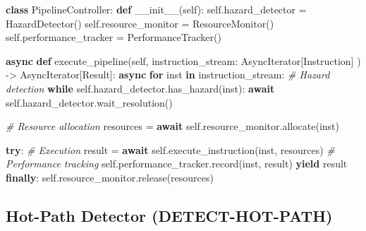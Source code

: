 \documentclass[
  11pt,
]{article}
\newenvironment{Shaded}{}{}
\newcommand{\CommentTok}[1]{\textcolor[rgb]{0.38,0.63,0.69}{\textit{#1}}}
\newcommand{\ControlFlowTok}[1]{\textcolor[rgb]{0.00,0.44,0.13}{\textbf{#1}}}
\newcommand{\FunctionTok}[1]{\textcolor[rgb]{0.02,0.16,0.49}{#1}}
\newcommand{\KeywordTok}[1]{\textcolor[rgb]{0.00,0.44,0.13}{\textbf{#1}}}
\newcommand{\NormalTok}[1]{#1}
\newcommand{\OperatorTok}[1]{\textcolor[rgb]{0.40,0.40,0.40}{#1}}
\newcommand{\VariableTok}[1]{\textcolor[rgb]{0.10,0.09,0.49}{#1}}
\begin{document}
\begin{Shaded}
\begin{Highlighting}[]
\KeywordTok{class}\NormalTok{ PipelineController:}
    \KeywordTok{def} \FunctionTok{\_\_init\_\_}\NormalTok{(}\VariableTok{self}\NormalTok{):}
        \VariableTok{self}\NormalTok{.hazard\_detector }\OperatorTok{=}\NormalTok{ HazardDetector()}
        \VariableTok{self}\NormalTok{.resource\_monitor }\OperatorTok{=}\NormalTok{ ResourceMonitor()}
        \VariableTok{self}\NormalTok{.performance\_tracker }\OperatorTok{=}\NormalTok{ PerformanceTracker()}
        
    \ControlFlowTok{async} \KeywordTok{def}\NormalTok{ execute\_pipeline(}\VariableTok{self}\NormalTok{, }
\NormalTok{                             instruction\_stream: AsyncIterator[Instruction]}
\NormalTok{                            ) }\OperatorTok{{-}\textgreater{}}\NormalTok{ AsyncIterator[Result]:}
        \ControlFlowTok{async} \ControlFlowTok{for}\NormalTok{ inst }\KeywordTok{in}\NormalTok{ instruction\_stream:}
            \CommentTok{\# Hazard detection}
            \ControlFlowTok{while} \VariableTok{self}\NormalTok{.hazard\_detector.has\_hazard(inst):}
                \ControlFlowTok{await} \VariableTok{self}\NormalTok{.hazard\_detector.wait\_resolution()}
                
            \CommentTok{\# Resource allocation}
\NormalTok{            resources }\OperatorTok{=} \ControlFlowTok{await} \VariableTok{self}\NormalTok{.resource\_monitor.allocate(inst)}
            
            \ControlFlowTok{try}\NormalTok{:}
                \CommentTok{\# Execution}
\NormalTok{                result }\OperatorTok{=} \ControlFlowTok{await} \VariableTok{self}\NormalTok{.execute\_instruction(inst, resources)}
                \CommentTok{\# Performance tracking}
                \VariableTok{self}\NormalTok{.performance\_tracker.record(inst, result)}
                \ControlFlowTok{yield}\NormalTok{ result}
            \ControlFlowTok{finally}\NormalTok{:}
                \VariableTok{self}\NormalTok{.resource\_monitor.release(resources)}
\end{Highlighting}
\end{Shaded}

\subsection{Hot-Path Detector
(DETECT-HOT-PATH)}\label{hot-path-detector-detect-hot-path}
\end{document}
